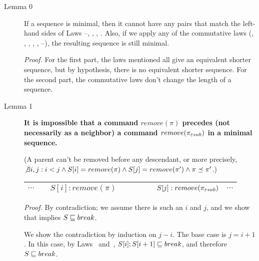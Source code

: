 \begin{description}
\item[Lemma 0]
If a sequence is minimal, then it cannot have any pairs that match the
left-hand sides of Laws \lawx--\lawxxxv, \lawiia, \lawiiap, \lawiiib.
Also, if we apply any of the
commutative laws 
(\lawi, \lawip, \lawiib, \lawiiia, \lawiiiap, \lawiv--\lawix),
the resulting sequence is still minimal.

\emph{Proof.}
For the first part, the laws mentioned all give an equivalent shorter
sequence, but by hypothesis, there is no equivalent shorter sequence.
For the second part, the commutative laws don't change the length of a
sequence.

\item[Lemma 1] {\bf It is impossible that a command
\(remove(\pi)\) precedes (not necessarily as a neighbor) a command
\(remove(\pi_{\varepsilon sub})\) in a minimal sequence.} 
\begin{notrsi}
(A parent can't be removed before any descendant, or
more precisely, \(\not\exists i,j: i<j \land S[i] = remove(\pi) \land
S[j] = remove(\pi') \land \pi \preceq \pi'\).)
\end{notrsi}
\begin{notrsi}
\begin{center}
\begin{tabular}{c|c|c|c|c|c|c|c|c}
\hline
\(\cdots\) & & \(S[i]: remove(\pi)\) & & & & &
\(S[j]: remove(\pi_{\varepsilon sub})\) & \(\cdots\) \\
\hline
\end{tabular}
\end{center}
\end{notrsi}
\emph{Proof.}
By contradiction; we assume there is such an \(i\) and \(j\), and we show
that implies \(S \sqsubseteq break\).

We show the contradiction by induction on \(j-i\).
The base case is \(j = i+1\).
In this case, by Laws \lawxxii~and~\lawxxiii, 
\(S[i]; S[i+1] \sqsubseteq break\),
and therefore \(S\sqsubseteq break\).


\end{description}
